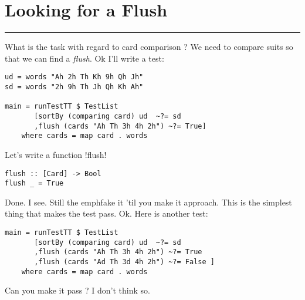 \newpage
\section{Looking for a Flush} %
\vspace{10cm}
\hrule

\lhQ What is the task with regard to card comparison ?
\lhA We need to compare suits so that we can find a \emph{flush}.
\lhN Ok I'll write a test:
\begin{lstlisting}[frame=single]
ud = words "Ah 2h Th Kh 9h Qh Jh"
sd = words "2h 9h Th Jh Qh Kh Ah"

main = runTestTT $ TestList 
       [sortBy (comparing card) ud  ~?= sd
       ,flush (cards "Ah Th 3h 4h 2h") ~?= True]
    where cards = map card . words
\end{lstlisting} %
\hspace*{\fill}
\lhA \error Let's write a function \il!flush!
\begin{lstlisting}[frame=single]
flush :: [Card] -> Bool
flush _ = True
\end{lstlisting}
\success Done.
\lhN I see. Still the emph{fake it 'til you make it} approach.
\lhA This is the simplest thing that makes the test pass.
\lhN Ok. Here is another test:
\begin{lstlisting}[frame=single]
main = runTestTT $ TestList 
       [sortBy (comparing card) ud  ~?= sd
       ,flush (cards "Ah Th 3h 4h 2h") ~?= True
       ,flush (cards "Ad Th 3d 4h 2h") ~?= False ]
    where cards = map card . words
\end{lstlisting} %
Can you make it pass ?
\lhA \failure I don't think so.
\lhend
